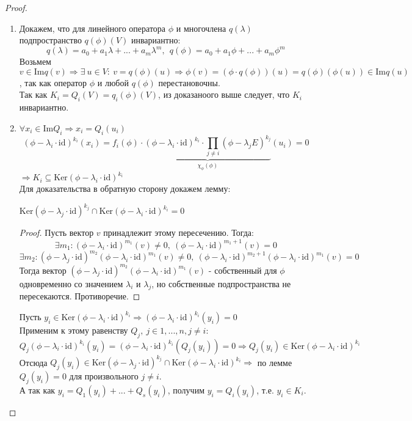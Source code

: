     \begin{proof}\tab 
        \begin{enumerate}
            \item Докажем, что для линейного оператора $\phi$ и многочлена $q(\lambda)$ подпространство $q(\phi)(V)$ инвариантно:
            $$q(\lambda) = a_0+ a_1 \lambda + ... + a_m \lambda^m, \ \ q(\phi) = a_0+ a_1 \phi + ... + a_m \phi^m$$
            Возьмем $v \in \text{Im}q(v) \Longrightarrow \exists \ u \in V: \ v = q(\phi)(u) \Longrightarrow \phi(v) = (\phi \cdot q(\phi))(u) = q(\phi)(\phi(u)) \in \text{Im}q(u)$, так как оператор $\phi$ и любой $q(\phi)$ перестановочны.\\
            Так как $K_i = Q_i(V) = q_i(\phi)(V)$, из доказаноого выше следует, что $K_i$ инвариантно.
            \item $\forall x_i \in \text{Im}Q_i \Longrightarrow x_i = Q_i(u_i)$
            $$(\phi-\lambda_i \cdot \text{id})^{k_i}(x_i) = f_i(\phi) \cdot \underbrace{(\phi-\lambda_i \cdot \text{id})^{k_i} \cdot \prod\limits_{j \neq i}(\phi-\lambda_j E)^{k_j}}_{\chi_\phi(\phi)}(u_i) = 0$$
            $\Longrightarrow K_i \subseteq \text{Ker}(\phi-\lambda_i \cdot \text{id})^{k_i}$\\ 
            Для доказательства в обратную сторону докажем лемму:
            \begin{lemma}
                $\text{Ker}(\phi-\lambda_j \cdot \text{id})^{k_j} \cap \text{Ker}(\phi-\lambda_i \cdot \text{id})^{k_i} = {0}$
            \end{lemma}
            \begin{proof}
                Пусть вектор $v$ принадлежит этому пересечению. Тогда:
                $$\exists m_1: (\phi-\lambda_i \cdot \text{id})^{m_1}(v) \neq 0, \ (\phi-\lambda_i \cdot \text{id})^{m_1 + 1}(v) = 0$$
                $$\exists m_2: (\phi-\lambda_j \cdot \text{id})^{m_2}(\phi-\lambda_i \cdot \text{id})^{m_1}(v) \neq 0, \ (\phi-\lambda_i \cdot \text{id})^{m_2 + 1}(\phi-\lambda_i \cdot \text{id})^{m_1}(v) = 0$$
                Тогда вектор $(\phi-\lambda_j \cdot \text{id})^{m_2}(\phi-\lambda_i \cdot \text{id})^{m_1}(v)$ - собственный для $\phi$ одновременно со значением $\lambda_i$ и $\lambda_j$, но собственные подпространства не пересекаются. Противоречие.
            \end{proof}
            Пусть $y_i \in \text{Ker}(\phi-\lambda_i \cdot \text{id})^{k_i} \Rightarrow (\phi-\lambda_i \cdot \text{id})^{k_i}(y_i) = 0$\\
            Применим к этому равенству $Q_j, \ j \in 1,...,n, j \neq i$:
            $$Q_j(\phi-\lambda_i \cdot \text{id})^{k_i}(y_i) = (\phi-\lambda_i \cdot \text{id})^{k_i}(Q_j(y_i)) = 0 \Rightarrow Q_j(y_i) \in \text{Ker}(\phi-\lambda_i \cdot \text{id})^{k_i}$$
            Отсюда $Q_j(y_i) \in \text{Ker}(\phi-\lambda_j \cdot \text{id})^{k_j} \cap \text{Ker}(\phi-\lambda_i \cdot \text{id})^{k_i} \Rightarrow$ по лемме $Q_j(y_i) = 0$ для произвольного $j \neq i$.\\
            А так как $y_i = Q_1(y_i) + ... + Q_s(y_i)$, получим $y_i = Q_i(y_i)$, т.е. $y_i \in K_i$.
        \end{enumerate}
    \end{proof} 
